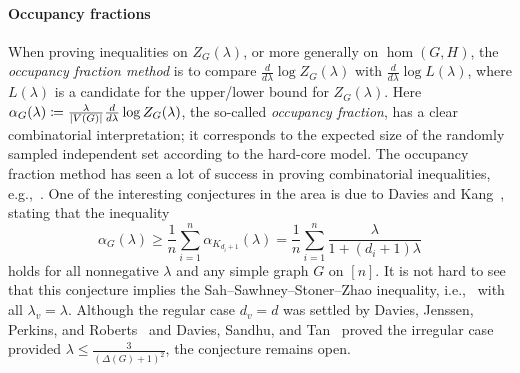 \documentclass{article}
\numberwithin{equation}{section}
\theoremstyle{plain}
\theoremstyle{definition}
\theoremstyle{remark} %
\DeclarePairedDelimiter{\abs}{\lvert}{\rvert}
\newcommand{\defeq}{\coloneqq}
\begin{document}
\paragraph{Occupancy fractions} When proving inequalities on $Z_G(\lambda)$, or more generally on $\hom(G,H)$, the \emph{occupancy fraction method} is to compare  $\frac{d}{d\lambda}\log Z_G(\lambda)$ with $\frac{d}{d\lambda}\log L(\lambda)$, where $L(\lambda)$ is a candidate for the upper/lower bound for $Z_G(\lambda)$.
Here $\alpha_G(\lambda)\defeq \frac{\lambda}{\abs{V(G)}} \frac{d}{d\lambda}\log Z_G(\lambda)$, the so-called \emph{occupancy fraction}, has a clear combinatorial interpretation; it corresponds to the expected size of the randomly sampled independent set according to the hard-core model. The occupancy fraction method has seen a lot of success in proving combinatorial inequalities, e.g.,~\cite{DJPR_2017,davies2018average}.
One of the interesting conjectures in the area is due to Davies and Kang~\cite{davies2025hardcore}, stating that the inequality
\begin{equation}\label{eq:occupancy-fraction-lower-bdd-clique}
    \alpha_G(\lambda) \geq \frac{1}{n}\sum_{i=1}^{n} \alpha_{K_{d_i +1}}(\lambda) = \frac{1}{n}\sum_{i=1}^{n}\frac{\lambda}{1+(d_i+1)\lambda}
\end{equation}
holds for all nonnegative $\lambda$ and any simple graph $G$ on $[n]$. It is not hard to see that this conjecture implies the Sah--Sawhney--Stoner--Zhao inequality, i.e.,~ with all $\lambda_v=\lambda$. 
Although the regular case $d_v=d$ was settled by Davies, Jenssen, Perkins, and Roberts~\cite{DJPR_2017} and Davies, Sandhu, and Tan~\cite[Theorem~1.3]{davies2025expectations} proved the irregular case provided $\lambda\leq \frac{3}{(\Delta(G)+1)^2}$, the conjecture remains open. 
\end{document}
